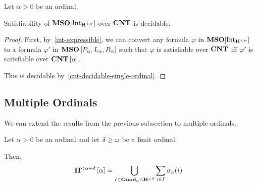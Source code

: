 \begin{theorem}\label{single-ordinal-satisfiability}
  Let $\alpha > 0$ be an ordinal.

  Satisfiability of $\mathbf{MSO}[\mathrm{Int}_{\mathbf{H}^{< \alpha}}]$
  over $\mathbf{CNT}$ is decidable.
\end{theorem}

\begin{proof}
  First, by~\cref{int-expressible}, we can convert
  any formula $\varphi$ in $\mathbf{MSO}[\mathrm{Int}_{\mathbf{H}^{< \alpha}}]$
  to a formula $\varphi'$ in $\mathbf{MSO} \left[ {P_\alpha, L_\alpha, R_\alpha} \right]$
  such that $\varphi$ is satisfiable over $\mathbf{CNT}$
  iff $\varphi'$ is satisfiable over $\mathbf{CNT} \left[ {\alpha} \right]$.

  This is decidable by~\cref{cnt-decidable-single-ordinal}.
\end{proof}

\subsection{Multiple Ordinals}
We can extend the results from the previous subsection to multiple ordinals.

\begin{lemma}\label{ho-decomposition-single-ordinal}
  Let $\alpha > 0$ be an ordinal
  and let $\delta \ge \omega$ be a limit ordinal.

  Then,
  \[
    \mathbf{H}^{< \alpha + \delta} \left[ {\alpha} \right] = \bigcup_{I \in \mathbf{Good}_{\alpha} \wedge \mathbf{H}^{< \delta}} \sum_{i \in I} \sigma_{\alpha}(i)
  \]

\end{lemma}

